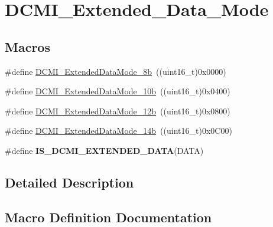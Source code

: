 \hypertarget{group___d_c_m_i___extended___data___mode}{}\section{D\+C\+M\+I\+\_\+\+Extended\+\_\+\+Data\+\_\+\+Mode}
\label{group___d_c_m_i___extended___data___mode}
\subsection*{Macros}
\begin{DoxyCompactItemize}
\item 
\#define \hyperlink{group___d_c_m_i___extended___data___mode_ga01627fb1fcd0d0682628e5bea8e5dfba}{D\+C\+M\+I\+\_\+\+Extended\+Data\+Mode\+\_\+8b}~((uint16\+\_\+t)0x0000)
\item 
\#define \hyperlink{group___d_c_m_i___extended___data___mode_gad47d200f9e2bf947dd07b9f8bc395336}{D\+C\+M\+I\+\_\+\+Extended\+Data\+Mode\+\_\+10b}~((uint16\+\_\+t)0x0400)
\item 
\#define \hyperlink{group___d_c_m_i___extended___data___mode_ga183733b7d784387200aa00b988c906da}{D\+C\+M\+I\+\_\+\+Extended\+Data\+Mode\+\_\+12b}~((uint16\+\_\+t)0x0800)
\item 
\#define \hyperlink{group___d_c_m_i___extended___data___mode_gae1a4ca9b9a1929a40213758e80d38e15}{D\+C\+M\+I\+\_\+\+Extended\+Data\+Mode\+\_\+14b}~((uint16\+\_\+t)0x0\+C00)
\item 
\#define {\bfseries I\+S\+\_\+\+D\+C\+M\+I\+\_\+\+E\+X\+T\+E\+N\+D\+E\+D\+\_\+\+D\+A\+T\+A}(D\+A\+T\+A)
\end{DoxyCompactItemize}


\subsection{Detailed Description}


\subsection{Macro Definition Documentation}
\hypertarget{group___d_c_m_i___extended___data___mode_gad47d200f9e2bf947dd07b9f8bc395336}{}
